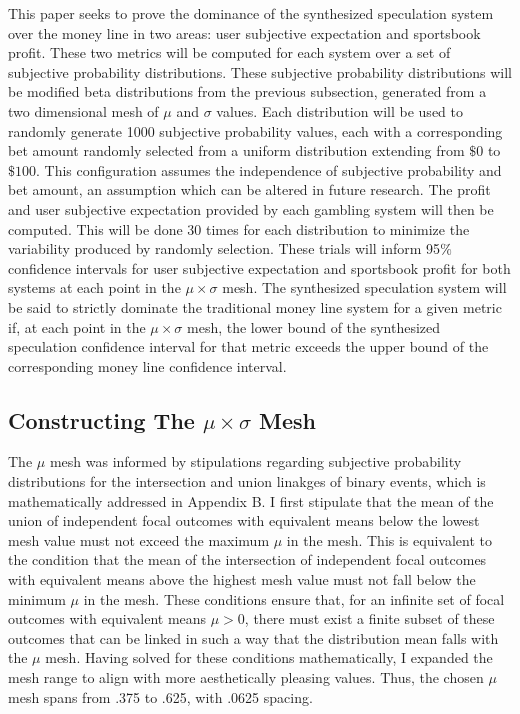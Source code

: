 \documentclass[sn-mathphys-num]{sn-jnl}
\theoremstyle{thmstyleone}%
\theoremstyle{thmstyletwo}%
\theoremstyle{thmstylethree}%
\begin{document}
This paper seeks to prove the dominance of the synthesized speculation system over the money line in two areas: user subjective expectation and sportsbook profit. These two metrics will be computed for each system over a set of subjective probability distributions. These subjective probability distributions will be modified beta distributions from the previous subsection, generated from a two dimensional mesh of $\mu$ and $\sigma$ values. Each distribution will be used to randomly generate 1000 subjective probability values, each with a corresponding bet amount randomly selected from a uniform distribution extending from $\$0$ to $\$100$. This configuration assumes the independence of subjective probability and bet amount, an assumption which can be altered in future research. The profit and user subjective expectation provided by each gambling system will then be computed. This will be done 30 times for each distribution to minimize the variability produced by randomly selection. These trials will inform 95$\%$ confidence intervals for user subjective expectation and sportsbook profit for both systems at each point in the $\mu \times \sigma$ mesh. The synthesized speculation system will be said to strictly dominate the traditional money line system for a given metric if, at each point in the $\mu \times \sigma$ mesh, the lower bound of the synthesized speculation confidence interval for that metric exceeds the upper bound of the corresponding money line confidence interval.

\subsection{Constructing The $\mu \times \sigma$ Mesh}

The $\mu$ mesh was informed by stipulations regarding subjective probability distributions for the intersection and union linakges of binary events, which is mathematically addressed in Appendix B. I first stipulate that the mean of the union of independent focal outcomes with equivalent means below the lowest mesh value must not exceed the maximum $\mu$ in the mesh. This is equivalent to the condition that the mean of the intersection of independent focal outcomes with equivalent means above the highest mesh value must not fall below the minimum $\mu$ in the mesh. These conditions ensure that, for an infinite set of focal outcomes with equivalent means $\mu > 0$, there must exist a finite subset of these outcomes that can be linked in such a way that the distribution mean falls with the $\mu$ mesh. Having solved for these conditions mathematically, I expanded the mesh range to align with more aesthetically pleasing values. Thus, the chosen $\mu$ mesh spans from .375 to .625, with .0625 spacing.
\end{document}
